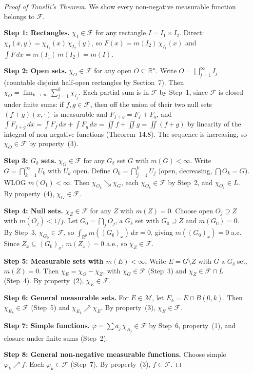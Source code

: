 \documentclass[11pt]{report}
\begin{document}
\begin{proof}[Proof of Tonelli's Theorem]
We show every non-negative measurable function belongs to $\mathcal{F}$.

\textbf{Step 1: Rectangles.} $\chi_I \in \mathcal{F}$ for any rectangle $I = I_1 \times I_2$. Direct: $\chi_I(x,y) = \chi_{I_1}(x)\,\chi_{I_2}(y)$, so $F(x) = m(I_2)\,\chi_{I_1}(x)$ and $\int F\,dx = m(I_1)\,m(I_2) = m(I)$.

\textbf{Step 2: Open sets.} $\chi_O \in \mathcal{F}$ for any open $O \subseteq \mathbb{R}^n$. Write $O = \bigsqcup_{j=1}^{\infty} I_j$ (countable disjoint half-open rectangles by Section~7). Then $\chi_O = \lim_{k \to \infty} \sum_{j=1}^{k} \chi_{I_j}$. Each partial sum is in $\mathcal{F}$ by Step~1, since $\mathcal{F}$ is closed under finite sums: if $f, g \in \mathcal{F}$, then off the union of their two null sets $(f+g)(x, \cdot)$ is measurable and $F_{f+g} = F_f + F_g$, and $\int F_{f+g}\,dx = \int F_f\,dx + \int F_g\,dx = \iint f + \iint g = \iint (f+g)$ by linearity of the integral of non-negative functions (Theorem~14.8). The sequence is increasing, so $\chi_O \in \mathcal{F}$ by property~(3).

\textbf{Step 3: $G_\delta$ sets.} $\chi_G \in \mathcal{F}$ for any $G_\delta$ set $G$ with $m(G) < \infty$. Write $G = \bigcap_{k=1}^{\infty} U_k$ with $U_k$ open. Define $O_k = \bigcap_{j=1}^{k} U_j$ (open, decreasing, $\bigcap O_k = G$). WLOG $m(O_1) < \infty$. Then $\chi_{O_k} \searrow \chi_G$, each $\chi_{O_k} \in \mathcal{F}$ by Step~2, and $\chi_{O_1} \in L$. By property~(4), $\chi_G \in \mathcal{F}$.

\textbf{Step 4: Null sets.} $\chi_Z \in \mathcal{F}$ for any $Z$ with $m(Z) = 0$. Choose open $O_j \supseteq Z$ with $m(O_j) < 1/j$. Let $G_0 = \bigcap_j O_j$, a $G_\delta$ set with $G_0 \supseteq Z$ and $m(G_0) = 0$. By Step~3, $\chi_{G_0} \in \mathcal{F}$, so $\int_{\mathbb{R}^p} m((G_0)_x)\,dx = 0$, giving $m((G_0)_x) = 0$ a.e. Since $Z_x \subseteq (G_0)_x$, $m(Z_x) = 0$ a.e., so $\chi_Z \in \mathcal{F}$.

\textbf{Step 5: Measurable sets with $m(E) < \infty$.} Write $E = G \setminus Z$ with $G$ a $G_\delta$ set, $m(Z) = 0$. Then $\chi_E = \chi_G - \chi_Z$, with $\chi_G \in \mathcal{F}$ (Step~3) and $\chi_Z \in \mathcal{F} \cap L$ (Step~4). By property~(2), $\chi_E \in \mathcal{F}$.

\textbf{Step 6: General measurable sets.} For $E \in \mathcal{M}$, let $E_k = E \cap B(0, k)$. Then $\chi_{E_k} \in \mathcal{F}$ (Step~5) and $\chi_{E_k} \nearrow \chi_E$. By property~(3), $\chi_E \in \mathcal{F}$.

\textbf{Step 7: Simple functions.} $\varphi = \sum a_j\,\chi_{A_j} \in \mathcal{F}$ by Step~6, property~(1), and closure under finite sums (Step~2).

\textbf{Step 8: General non-negative measurable functions.} Choose simple $\varphi_k \nearrow f$. Each $\varphi_k \in \mathcal{F}$ (Step~7). By property~(3), $f \in \mathcal{F}$.
\end{proof}
\end{document}
